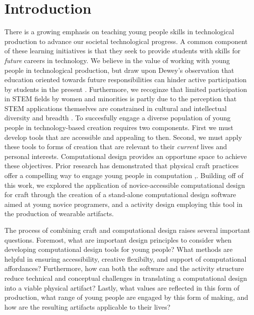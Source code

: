 \documentclass{sigchi}
\begin{document}
\section{Introduction} %
There is a growing emphasis on teaching young people skills in technological production to advance our societal technological progress. A common component of these learning initiatives is that they seek to provide students with skills for \textit{future} careers in technology. We believe in the value of working with young people in technological production, but draw upon Dewey's observation that education oriented towards future responsibilities can hinder active participation by students in the present \cite{dewey}. Furthermore, we recoginze that limited participation in STEM fields by women and minorities is partly due to the perception that STEM applications themselves are constrained in cultural and intellectual diversity and breadth \cite{buechley_wild}. To succesfully engage a diverse population of young people in technology-based creation requires two components. First we must develop tools that are accessible and appealing to then.  Second, we must apply these tools to forms of creation that are relevant to their \emph{current} lives and personal interests. Computational design provides an opportune space to achieve these objectives. Prior research has demonstrated that physical craft practices offer a compelling way to engage young people in computation \cite{buechley_comptext},\cite{codeable_objects}. Building off of this work, we explored the application of novice-accessible computational design for craft through the creation of a stand-alone computational design software aimed at young novice programers, and a activity design employing this tool in the production of wearable artifacts.

The process of combining craft and computational design raises several important questions. Foremost, what are important design principles to consider when developing computational design tools for young people? What methods are helpful in ensuring accessibility, creative flexibilty, and support of computational affordances? Furthermore, how can both the software and the activity structure reduce technical and conceptual challenges in translating a computational design into a viable physical artifact? Lastly, what values are reflected in this form of production, what range of young people are engaged by this form of making, and how are the resulting artifacts applicable to their lives?
\end{document}
